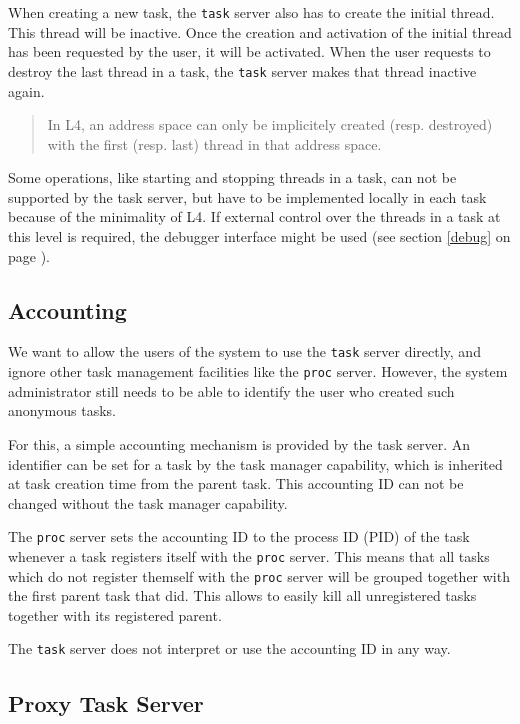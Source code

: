 \documentclass[9pt,a4paper]{extarticle}
\newenvironment{comment}{\footnotesize \begin{quote}}{\end{quote}}
\begin{document}
When creating a new task, the \texttt{task} server also has to create
the initial thread.  This thread will be inactive.  Once the creation
and activation of the initial thread has been requested by the user,
it will be activated.  When the user requests to destroy the last
thread in a task, the \texttt{task} server makes that thread inactive
again.

\begin{comment}
  In L4, an address space can only be implicitely created (resp.
  destroyed) with the first (resp. last) thread in that address space.
\end{comment}

Some operations, like starting and stopping threads in a task, can not
be supported by the task server, but have to be implemented locally in
each task because of the minimality of L4.  If external control over
the threads in a task at this level is required, the debugger
interface might be used (see section \ref{debug} on page
\pageref{debug}).


\subsection{Accounting}

We want to allow the users of the system to use the \texttt{task}
server directly, and ignore other task management facilities like the
\texttt{proc} server.  However, the system administrator still needs
to be able to identify the user who created such anonymous tasks.

For this, a simple accounting mechanism is provided by the task
server.  An identifier can be set for a task by the task manager
capability, which is inherited at task creation time from the parent
task.  This accounting ID can not be changed without the task manager
capability.

The \texttt{proc} server sets the accounting ID to the process ID
(PID) of the task whenever a task registers itself with the
\texttt{proc} server.  This means that all tasks which do not register
themself with the \texttt{proc} server will be grouped together with
the first parent task that did.  This allows to easily kill all
unregistered tasks together with its registered parent.

The \texttt{task} server does not interpret or use the accounting ID
in any way.


\subsection{Proxy Task Server}
\label{proxytaskserver}
\end{document}
